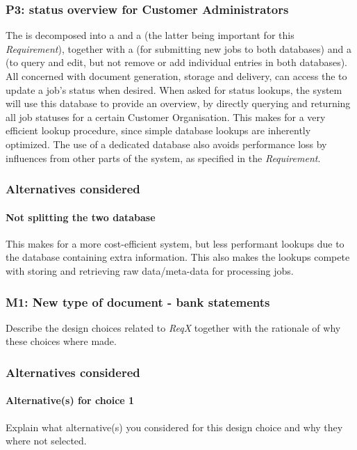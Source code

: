 \subsubsection{P3: status overview for Customer Administrators}\label{march:p3}
The  is decomposed into a  and a  (the latter being important for this \emph{Requirement}), together with a  (for submitting new jobs to both databases) and a  (to query and edit, but not remove or add individual entries in both databases). All  concerned with document generation, storage and delivery, can access the  to update a job's status when desired. When asked for status lookups, the system will use this database to provide an overview, by directly querying and returning all job statuses for a certain Customer Organisation. This makes for a very efficient lookup procedure, since simple database lookups are inherently optimized. The use of a dedicated database also avoids performance loss by influences from other parts of the system, as specified in the \emph{Requirement}.

\subsubsection*{Alternatives considered}
\paragraph{Not splitting the two database} This makes for a more cost-efficient system, but less performant lookups due to the database containing extra information. This also makes the lookups compete with storing and retrieving raw data/meta-data for processing jobs.

\subsubsection{M1: New type of document - bank statements}\label{march:m1}
Describe the design choices related to \emph{ReqX} together with the rationale
of why these choices where made.

\subsubsection*{Alternatives considered}
\paragraph{Alternative(s) for choice 1} Explain what alternative(s) you
considered for this design choice and why they where not selected.

